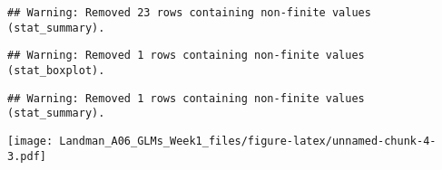 \documentclass[]{article}
\begin{document}
\begin{verbatim}
## Warning: Removed 23 rows containing non-finite values (stat_summary).
\end{verbatim}

\begin{verbatim}
## Warning: Removed 1 rows containing non-finite values (stat_boxplot).
\end{verbatim}

\begin{verbatim}
## Warning: Removed 1 rows containing non-finite values (stat_summary).
\end{verbatim}

\texttt{[image: Landman\_A06\_GLMs\_Week1\_files/figure-latex/unnamed-chunk-4-3.pdf]}
\end{document}
